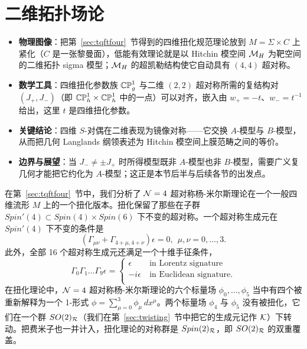 
\section{二维拓扑场论}
\label{sec:tqfttwo}

\begin{keytakeaways}
  \begin{itemize}[leftmargin=1.4em,itemsep=2pt,topsep=2pt]
    \item \textbf{物理图像}：把第~\ref{sec:tqftfour}~节得到的四维扭化规范理论放到 $M=\Sigma\times C$ 上紧化（$C$ 是一张黎曼面），低能有效理论就是以 Hitchin 模空间 $\MH$ 为靶空间的二维拓扑 sigma 模型；$\MH$ 的超凯勒结构使它自动具有 $(4,4)$ 超对称。
    \item \textbf{数学工具}：四维扭化参数族 $\Bbb{CP}^1_g$ 与二维 $(2,2)$ 超对称所需的复结构对 $(J_+,J_-)$（即 $\Bbb{CP}^1_h\times\Bbb{CP}^1_h$ 中的一点）可以对齐，嵌入由 $w_+=-t$、$w_-=t^{-1}$ 给出，这里 $t$ 是四维扭化参数。
    \item \textbf{关键结论}：四维 $S$-对偶在二维表现为镜像对称——它交换 $A$-模型与 $B$-模型，从而把几何 Langlands 纲领表述为 Hitchin 模空间上膜范畴之间的等价。
    \item \textbf{边界与展望}：当 $J_-\ne\pm J_+$ 时所得模型既非 $A$-模型也非 $B$-模型，需要广义复几何才能把它约化为 $A$-模型；这正是本节后半与后续各节的出发点。
  \end{itemize}
\end{keytakeaways}

在第~\ref{sec:tqftfour}~节中，我们分析了 ${\cal N}=4$ 超对称杨-米尔斯理论在一个一般四维流形 $M$ 上的一个扭化版本。扭化保留了那些在子群 $Spin'(4)\subset Spin(4)\times Spin(6)$ 下不变的超对称。一个超对称生成元在 $Spin'(4)$ 下不变的条件是
\setcounter{equation}{0}
\begin{equation}\label{eq:tory}
\left(\Gamma_{\mu\nu}+\Gamma_{4+\mu,4+\nu}\right)\epsilon=0,
~~\mu,\nu=0,\dots,3.
\end{equation}
  此外，全部 16 个超对称生成元还满足一个十维手征条件，
\setcounter{equation}{1}
\begin{equation}\label{eq:nory}
\Gamma_0\Gamma_1\dots\Gamma_9\epsilon=\begin{cases}\epsilon&
~\text{in Lorentz signature}\\-i\epsilon&~\text{in Euclidean
signature.}\\\end{cases}
\end{equation}
 在扭化理论中，${\EUN}=4$ 超对称杨-米尔斯理论的六个标量场 $\phi_0,\dots,\phi_5$ 当中有四个被重新解释为一个 1-形式 $\phi=\sum_{\mu=0}^3\phi_\mu\,dx^\mu$。两个标量场 $\phi_4$ 与 $\phi_5$ 没有被扭化，它们在一个群 $SO(2)_{\cal R}$（我们在第~\ref{sec:twisting}~节中把它的生成元记作 ${\cal K}$）下转动。把费米子也一并计入，扭化理论的对称群是 $Spin(2)_{\cal R}$，即 $SO(2)_{\cal R}$ 的双重覆盖。

